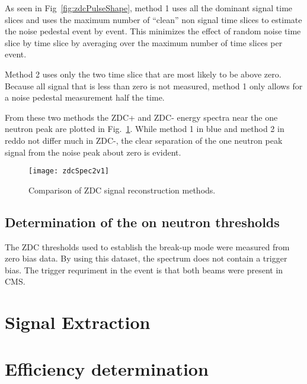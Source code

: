       As seen in Fig~\ref{fig:zdcPulseShape}, method 1 uses all the dominant 
        signal time slices and uses the maximum number of “clean” non signal 
        time slices to estimate the noise pedestal event by event. 
      This minimizes the effect of random noise time slice by time slice by 
        averaging over the maximum number of time slices per event. 

      Method 2 uses only the two time slice that are most likely to be above 
        zero. 
      Because all signal that is less than zero is not measured, method 1 
        only allows for a noise pedestal measurement half the time.
    
      From these two methods the ZDC+ and ZDC- energy spectra near the 
        one neutron peak are plotted in Fig.~\ref{fig:zdcSpec2v1}.
      While method 1 in blue and method 2 in reddo not differ much in ZDC-, 
        the clear separation of the one neutron peak signal from the noise 
        peak about zero is evident. 
      \begin{figure}[h]
        \centering
        \texttt{[image: zdcSpec2v1]}
        \caption{Comparison of ZDC signal reconstruction methods.}
        \label{fig:zdcSpec2v1}
      \end{figure}

    \subsection{Determination of the on neutron thresholds}
      The ZDC thresholds used to establish the break-up mode were measured from
        zero bias data.
      By using this dataset, the spectrum does not contain a trigger bias. 
      The trigger requriment in the event is that both beams were present in 
        CMS.

        
  \section{Signal Extraction}
  \section{Efficiency determination}
